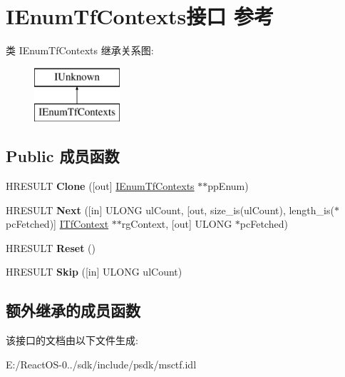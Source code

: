 \hypertarget{interface_i_enum_tf_contexts}{}\section{I\+Enum\+Tf\+Contexts接口 参考}
\label{interface_i_enum_tf_contexts}
类 I\+Enum\+Tf\+Contexts 继承关系图\+:\begin{figure}[H]
\begin{center}
\leavevmode
\includegraphics[height=2.000000cm]{interface_i_enum_tf_contexts}
\end{center}
\end{figure}
\subsection*{Public 成员函数}
\begin{DoxyCompactItemize}
\item 
\mbox{\label{interface_i_enum_tf_contexts_a1bea57de401e53cad9b3fa422c8dc4f6}} 
H\+R\+E\+S\+U\+LT {\bfseries Clone} (\mbox{[}out\mbox{]} \hyperlink{interface_i_enum_tf_contexts}{I\+Enum\+Tf\+Contexts} $\ast$$\ast$pp\+Enum)
\item 
\mbox{\label{interface_i_enum_tf_contexts_a646144b1fde936d83d8523638142694d}} 
H\+R\+E\+S\+U\+LT {\bfseries Next} (\mbox{[}in\mbox{]} U\+L\+O\+NG ul\+Count, \mbox{[}out, size\+\_\+is(ul\+Count), length\+\_\+is($\ast$pc\+Fetched)\mbox{]} \hyperlink{interface_i_tf_context}{I\+Tf\+Context} $\ast$$\ast$rg\+Context, \mbox{[}out\mbox{]} U\+L\+O\+NG $\ast$pc\+Fetched)
\item 
\mbox{\label{interface_i_enum_tf_contexts_aa8861c08c8c9ca03dd5e5fbe3968af52}} 
H\+R\+E\+S\+U\+LT {\bfseries Reset} ()
\item 
\mbox{\label{interface_i_enum_tf_contexts_a002592ed948133639f818d9fbda50a89}} 
H\+R\+E\+S\+U\+LT {\bfseries Skip} (\mbox{[}in\mbox{]} U\+L\+O\+NG ul\+Count)
\end{DoxyCompactItemize}
\subsection*{额外继承的成员函数}


该接口的文档由以下文件生成\+:\begin{DoxyCompactItemize}
\item 
E\+:/\+React\+O\+S-\/0../sdk/include/psdk/msctf.\+idl\end{DoxyCompactItemize}
